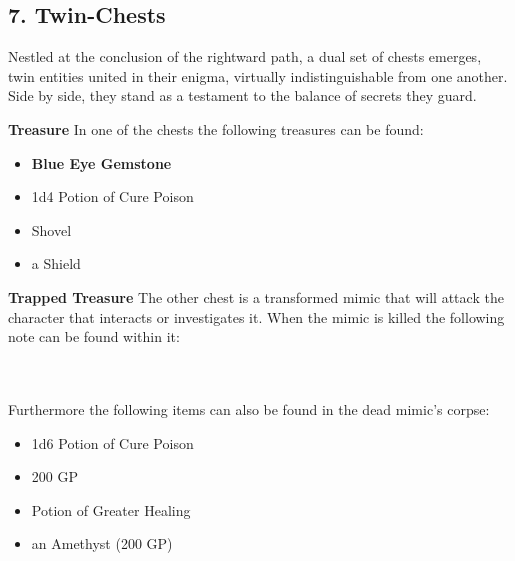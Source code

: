 \subsection*{7. Twin-Chests}
{\entryfont
	Nestled at the conclusion of the rightward path, a dual set of chests emerges, twin entities united in their enigma, virtually indistinguishable from one another. Side by side, they stand as a testament to the balance of secrets they guard.
	
	\textbf{Treasure}
	In one of the chests the following treasures can be found:
	\begin{itemize}
		\item \textbf{Blue Eye Gemstone}
		\item 1d4 Potion of Cure Poison
		\item Shovel
		\item a Shield
	\end{itemize}
	
	\textbf{Trapped Treasure}
	The other chest is a transformed mimic that will attack the character that interacts or investigates it. When the mimic is killed the following note can be found within it:\\\\
	\hfill\\
	Furthermore the following items can also be found in the dead mimic's corpse:
	\begin{itemize}
		\item 1d6 Potion of Cure Poison
		\item 200 GP
		\item Potion of Greater Healing
		\item an Amethyst (200 GP)
	\end{itemize}
}

